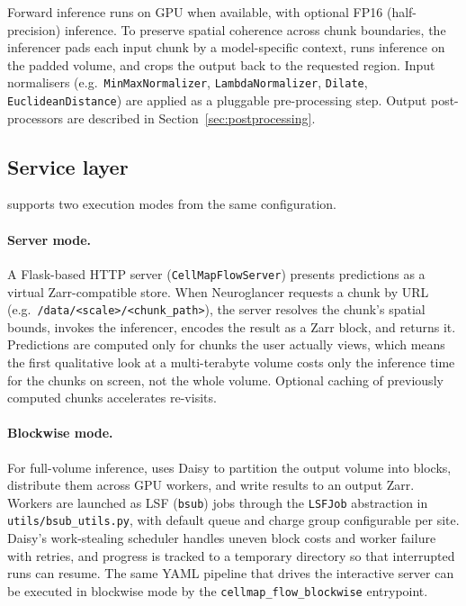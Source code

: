 Forward inference runs on GPU when available, with optional FP16 (half-precision) inference. To preserve spatial coherence across chunk boundaries, the inferencer pads each input chunk by a model-specific context, runs inference on the padded volume, and crops the output back to the requested region. Input normalisers (e.g.\ \texttt{MinMaxNormalizer}, \texttt{LambdaNormalizer}, \texttt{Dilate}, \texttt{EuclideanDistance}) are applied as a pluggable pre-processing step. Output post-processors are described in Section~\ref{sec:postprocessing}.

\subsection*{Service layer}

\cellmapflow{} supports two execution modes from the same configuration.

\paragraph{Server mode.} A Flask-based HTTP server (\texttt{CellMapFlowServer}) presents predictions as a virtual Zarr-compatible store. When Neuroglancer requests a chunk by URL (e.g.\ \texttt{/data/<scale>/<chunk\_path>}), the server resolves the chunk's spatial bounds, invokes the inferencer, encodes the result as a Zarr block, and returns it. Predictions are computed only for chunks the user actually views, which means the first qualitative look at a multi-terabyte volume costs only the inference time for the chunks on screen, not the whole volume. Optional caching of previously computed chunks accelerates re-visits.

\paragraph{Blockwise mode.} For full-volume inference, \cellmapflow{} uses Daisy \cite{DaisyFunke} to partition the output volume into blocks, distribute them across GPU workers, and write results to an output Zarr. Workers are launched as LSF (\texttt{bsub}) jobs through the \texttt{LSFJob} abstraction in \texttt{utils/bsub\_utils.py}, with default queue and charge group configurable per site. Daisy's work-stealing scheduler handles uneven block costs and worker failure with retries, and progress is tracked to a temporary directory so that interrupted runs can resume. The same YAML pipeline that drives the interactive server can be executed in blockwise mode by the \texttt{cellmap\_flow\_blockwise} entrypoint.

